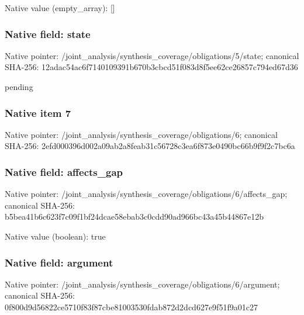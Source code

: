 \documentclass[10pt,a4paper]{article}
\begin{document}
Native value (empty\_\allowbreak{}array): []

\subsubsection{Native field: state}
Native pointer: /joint\_\allowbreak{}analysis/synthesis\_\allowbreak{}coverage/obligations/5/state; canonical SHA-256: 12adac54ac6f7140109391b670b3cbcd51f083d8f5ee62ce26857c794ed67d36

\begingroup\raggedright\sloppy pending\par\endgroup

\subsubsection{Native item 7}
Native pointer: /joint\_\allowbreak{}analysis/synthesis\_\allowbreak{}coverage/obligations/6; canonical SHA-256: 2efd000396d002a09ab2a8feab31c56728c3ea6f873e0490bc66b9f9f2c7bc6a

\subsubsection{Native field: affects\_\allowbreak{}gap}
Native pointer: /joint\_\allowbreak{}analysis/synthesis\_\allowbreak{}coverage/obligations/6/affects\_\allowbreak{}gap; canonical SHA-256: b5bea41b6c623f7c09f1bf24dcae58ebab3c0cdd90ad966bc43a45b44867e12b

Native value (boolean): true

\subsubsection{Native field: argument}
Native pointer: /joint\_\allowbreak{}analysis/synthesis\_\allowbreak{}coverage/obligations/6/argument; canonical SHA-256: 0f800d9d56822ce5710f83f87cbe81003530fdab872d2dcd627e9f51f9a01c27
\end{document}
